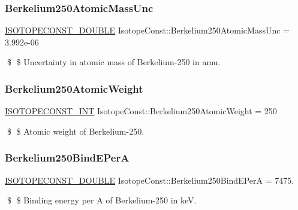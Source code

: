 \subsubsection{\texorpdfstring{Berkelium250\+Atomic\+Mass\+Unc}{Berkelium250AtomicMassUnc}}
{\footnotesize\ttfamily \mbox{\hyperlink{group___isotope_const-_macros_ga8f45a7272ce02c0b4c65c44636ed719a}{I\+S\+O\+T\+O\+P\+E\+C\+O\+N\+S\+T\+\_\+\+D\+O\+U\+B\+LE}} Isotope\+Const\+::\+Berkelium250\+Atomic\+Mass\+Unc = 3.\+992e-\/06}

\$ \$ Uncertainty in atomic mass of Berkelium-\/250 in amu. \mbox{\label{group___isotope_const-_berkelium-_bk250_ga2f0e35814183f488c199509bfce5c5ae}} 
\subsubsection{\texorpdfstring{Berkelium250\+Atomic\+Weight}{Berkelium250AtomicWeight}}
{\footnotesize\ttfamily \mbox{\hyperlink{group___isotope_const-_macros_ga5f18360b3e99483a35c32d789e62621c}{I\+S\+O\+T\+O\+P\+E\+C\+O\+N\+S\+T\+\_\+\+I\+NT}} Isotope\+Const\+::\+Berkelium250\+Atomic\+Weight = 250}

\$ \$ Atomic weight of Berkelium-\/250. \mbox{\label{group___isotope_const-_berkelium-_bk250_ga0e51126d470fbeae857e069126c2f9e0}} 
\subsubsection{\texorpdfstring{Berkelium250\+Bind\+E\+PerA}{Berkelium250BindEPerA}}
{\footnotesize\ttfamily \mbox{\hyperlink{group___isotope_const-_macros_ga8f45a7272ce02c0b4c65c44636ed719a}{I\+S\+O\+T\+O\+P\+E\+C\+O\+N\+S\+T\+\_\+\+D\+O\+U\+B\+LE}} Isotope\+Const\+::\+Berkelium250\+Bind\+E\+PerA = 7475.}

\$ \$ Binding energy per A of Berkelium-\/250 in keV. \mbox{\label{group___isotope_const-_berkelium-_bk250_ga614a9c0806fd3c690299147f4497b875}} 
